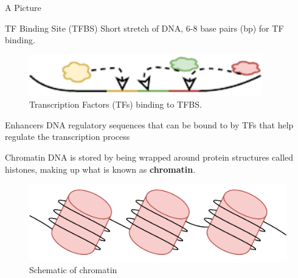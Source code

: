\documentclass{beamer}
\begin{document}
    \begin{frame}{A Picture}
    \begin{block}{TF Binding Site (TFBS)}
            Short stretch of DNA, 6-8 base pairs (bp) for TF binding.
            \end{block}
        \begin{figure}
            \centering
            \includegraphics[width = 0.9\textwidth]{tfBinding.pdf}
            \caption{Transcription Factors (TFs) binding to TFBS.}
            \label{fig:yeet}
        \end{figure}
         \begin{block}{Enhancers}
            DNA regulatory sequences that can be bound to by TFs that help regulate the transcription process
        \end{block}
    \end{frame}
    

   
    \begin{frame}{Chromatin}
        DNA is stored by being wrapped around protein structures called histones, making up what is known as \textbf{chromatin}.
        \begin{figure}
            \centering
            \includegraphics{Chromatin.pdf}
            \caption{Schematic of chromatin}%
            \label{fig:chromatin}
        \end{figure}
    \end{frame}
    
\end{document}
